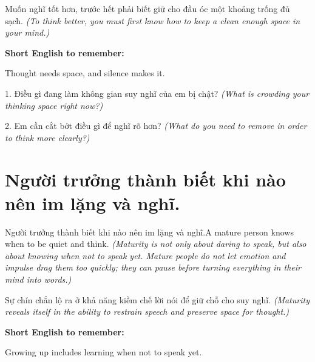 \begin{baihoc}
Muốn nghĩ tốt hơn, trước hết phải biết giữ cho đầu óc một khoảng trống đủ sạch.
\textit{(To think better, you must first know how to keep a clean enough space in your mind.)}
\end{baihoc}

\begin{ghinhoanh}
\textbf{Short English to remember:}

Thought needs space, and silence makes it.

\end{ghinhoanh}

\begin{tuhocnhanh}
1. Điều gì đang làm không gian suy nghĩ của em bị chật? \textit{(What is crowding your thinking space right now?)}

2. Em cần cắt bớt điều gì để nghĩ rõ hơn? \textit{(What do you need to remove in order to think more clearly?)}
\end{tuhocnhanh}
\ngancach


\section{Người trưởng thành biết khi nào nên im lặng và nghĩ.}
\begin{truyen}{Người trưởng thành biết khi nào nên im lặng và nghĩ.}{A mature person knows when to be quiet and think.}
\textit{(Maturity is not only about daring to speak, but also about knowing when not to speak yet. Mature people do not let emotion and impulse drag them too quickly; they can pause before turning everything in their mind into words.)}
\end{truyen}

\begin{baihoc}
Sự chín chắn lộ ra ở khả năng kiềm chế lời nói để giữ chỗ cho suy nghĩ.
\textit{(Maturity reveals itself in the ability to restrain speech and preserve space for thought.)}
\end{baihoc}

\begin{ghinhoanh}
\textbf{Short English to remember:}

Growing up includes learning when not to speak yet.

\end{ghinhoanh}

